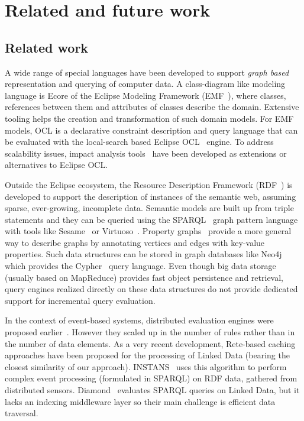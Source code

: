\chapter{Related and future work}



\section{Related work}
\label{sec:relwork}

A wide range of special languages have been developed to support \emph{graph based} representation and querying of computer data. A class-diagram like modeling language is Ecore of the Eclipse Modeling Framework (EMF~\cite{EMF}), where classes, references between them and attributes of classes describe the domain. Extensive tooling helps the creation and transformation of such domain models. For EMF models, OCL is a declarative constraint description and query language that can be evaluated with the local-search based Eclipse OCL~\cite{EclipseOCL} engine. To address scalability issues, impact analysis tools~\cite{OCLIA} have been developed as extensions or alternatives to Eclipse OCL.

Outside the Eclipse ecosystem, the Resource Description Framework (RDF~\cite{website:rdf_standard}) is developed to support the description of instances of the semantic web, assuming sparse, ever-growing, incomplete data. Semantic models are built up from triple statements and they can be queried using the SPARQL~\cite{SPARQL} graph pattern language with tools like Sesame~\cite{sesame} or Virtuoso~\cite{openvirtuoso}. Property graphs~\cite{DBLP:journals/corr/abs-1006-2361} provide a more general way to describe graphs by annotating vertices and edges with key-value properties. Such data structures can be stored in graph databases like Neo4j~\cite{neo4j} which provides the Cypher~\cite{cypher} query language. Even though big data storage (usually based on MapReduce) provides fast object persistence and retrieval, query engines realized directly on these data structures do not provide dedicated support for incremental query evaluation. 

In the context of event-based systems, distributed evaluation engines were proposed earlier~\cite{message-passing-rete}. However they scaled up in the number of rules \cite{mapreduce-rete} rather than in the number of data elements. As a very recent development, Rete-based caching approaches have been proposed for the processing of Linked Data (bearing the closest similarity of our approach). INSTANS~\cite{INSTANS2012} uses this algorithm to perform complex event processing (formulated in SPARQL) on RDF data, gathered from distributed sensors. Diamond~\cite{miranker2012diamond} evaluates SPARQL queries on Linked Data, but it lacks an indexing middleware layer so their main challenge is efficient data traversal.

